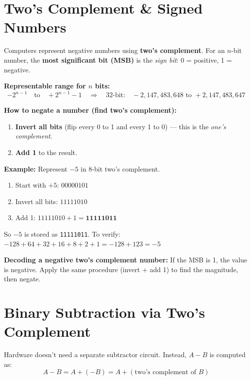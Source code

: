 \documentclass[11pt, letterpaper]{article}
\begin{document}
\section*{Two's Complement \& Signed Numbers}

Computers represent negative numbers using \textbf{two's complement}. For an $n$-bit number, the \textbf{most significant bit (MSB)} is the \emph{sign bit}: 0 = positive, 1 = negative.

\textbf{Representable range for $n$ bits:}
\[
  -2^{n-1} \quad \text{to} \quad +2^{n-1}-1
  \quad\Longrightarrow\quad
  \text{32-bit:}\quad -2{,}147{,}483{,}648 \text{ to } +2{,}147{,}483{,}647
\]

\textbf{How to negate a number (find two's complement):}
\begin{enumerate}[noitemsep]
  \item \textbf{Invert all bits} (flip every 0 to 1 and every 1 to 0) --- this is the \emph{one's complement}.
  \item \textbf{Add 1} to the result.
\end{enumerate}

\begin{tcolorbox}[colback=part2bg, colframe=sectiongreen, arc=3pt, boxrule=1pt]
\textbf{Example:} Represent $-5$ in 8-bit two's complement.
\begin{enumerate}[noitemsep, leftmargin=*]
  \item Start with $+5$: \quad $00000101$
  \item Invert all bits: \quad $11111010$
  \item Add 1: \quad $11111010 + 1 = \mathbf{11111011}$
\end{enumerate}
So $-5$ is stored as \texttt{11111011}. To verify: $-128 + 64 + 32 + 16 + 8 + 2 + 1 = -128 + 123 = -5$ \checkmark
\end{tcolorbox}

\textbf{Decoding a negative two's complement number:} If the MSB is 1, the value is negative. Apply the same procedure (invert + add 1) to find the magnitude, then negate.

\section*{Binary Subtraction via Two's Complement}

Hardware doesn't need a separate subtractor circuit. Instead, $A - B$ is computed as:
\[
  A - B = A + (-B) = A + (\text{two's complement of } B)
\]
\end{document}
